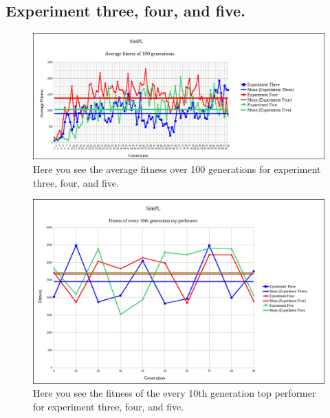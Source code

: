 \documentclass[a4paper,10pt]{article}
\begin{document}
\subsection{Experiment three, four, and five.}

\begin{figure}[H]  
  \centering
  \includegraphics[width=1\textwidth]{figures/exp345_avg_fit.png}
  \caption{Here you see the average fitness over 100 generations for experiment three, four, and five.}
  \label{fig:exp345_avg_fit}
\end{figure}

\begin{figure}[H]  
  \centering
  \includegraphics[width=1\textwidth]{figures/exp345_10_tops.png}
  \caption{Here you see the fitness of the every 10th generation top performer for experiment three, four, and five.}
  \label{fig:exp345_10_tops}
\end{figure}
\end{document}

